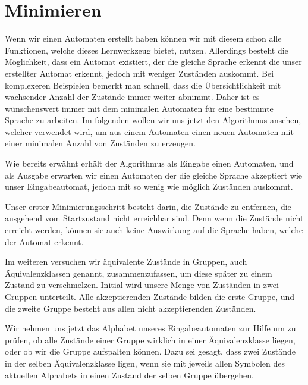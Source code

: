 

\chapter{Minimieren}\label{Minimize}

Wenn wir einen Automaten erstellt haben können wir mit diesem schon alle
Funktionen, welche dieses Lernwerkzeug bietet, nutzen. Allerdings besteht die
Möglichkeit, dass ein Automat existiert, der die gleiche Sprache erkennt die
unser erstellter Automat erkennt, jedoch mit weniger Zuständen auskommt. Bei
komplexeren Beispielen bemerkt man schnell, dass die Übersichtlichkeit mit
wachsender Anzahl der Zustände immer weiter abnimmt. Daher ist es wünschenswert
immer mit dem minimalen Automaten für eine bestimmte Sprache zu arbeiten. Im
folgenden wollen wir uns jetzt den Algorithmus ansehen, welcher verwendet wird,
um aus einem Automaten einen neuen Automaten mit einer minimalen Anzahl von
Zuständen zu erzeugen.\vspace{10pt}

Wie bereits erwähnt erhält der Algorithmus als Eingabe einen Automaten, und als
Ausgabe erwarten wir einen Automaten der die gleiche Sprache akzeptiert wie
unser Eingabeautomat, jedoch mit so wenig wie möglich Zuständen
auskommt.\vspace{10pt}

Unser erster Minimierungsschritt besteht darin, die Zustände zu entfernen, die
ausgehend vom Startzustand nicht erreichbar sind. Denn wenn die Zustände nicht
erreicht werden, können sie auch keine Auswirkung auf die Sprache haben, welche
der Automat erkennt.\vspace{10pt}

Im weiteren versuchen wir äquivalente Zustände in Gruppen, auch
Äquivalenz\-klassen genannt, zusammenzufassen, um diese später zu einem Zustand
zu verschmelzen. Initial wird unsere Menge von Zuständen in zwei Gruppen
unterteilt. Alle akzeptierenden Zustände bilden die erste Gruppe, und die
zweite Gruppe besteht aus allen nicht akzeptierenden Zuständen.\vspace{10pt}

Wir nehmen uns jetzt das Alphabet unseres Eingabeautomaten zur Hilfe um zu
prüfen, ob alle Zustände einer Gruppe wirklich in einer Äquivalenzklasse
liegen, oder ob wir die Gruppe aufspalten können. Dazu sei gesagt, dass zwei
Zustände in der selben Äquivalenzklasse ligen, wenn sie mit jeweils allen
Symbolen des aktuellen Alphabets in einen Zustand der selben Gruppe
übergehen.\vspace{10pt}

